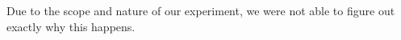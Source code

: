 \documentclass[preview]{standalone}
\begin{document}
\begin{center}
Due to the scope and nature of our experiment, we were not able to figure out exactly why this happens.
\end{center}
\end{document}
